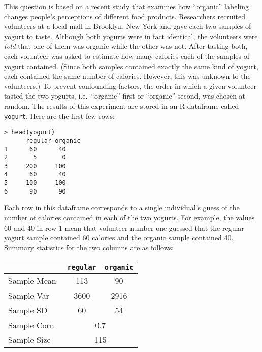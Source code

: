 \documentclass[addpoints,12pt]{exam}
\begin{document}
\begin{questions}
\question This question is based on a recent study that examines how ``organic'' labeling changes people's perceptions of different food products. Researchers recruited volunteers at a local mall in Brooklyn, New York and gave each two samples of yogurt to taste. Although both yogurts were in fact identical, the volunteers were \emph{told} that one of them was organic while the other was not. After tasting both, each volunteer was asked to estimate how many calories each of the samples of yogurt contained. (Since both samples contained exactly the same kind of yogurt, each contained the same number of calories. However, this was unknown to the volunteers.) To prevent confounding factors, the order in which a given volunteer tasted the two yogurts, i.e.\ ``organic'' first or ``organic'' second, was chosen at random. The results of this experiment are stored in an R dataframe called \texttt{yogurt}. Here are the first few rows:
	\begin{verbatim}
> head(yogurt)
	  regular organic
1      60      40
2       5       0
3     200     100
4      60      40
5     100     100
6      90      90
	\end{verbatim}
Each row in this dataframe corresponds to a single individual's guess of the number of calories contained in each of the two yogurts. For example, the values 60 and 40 in row 1 mean that volunteer number one guessed that the regular yogurt sample contained 60 calories and the organic sample contained 40. Summary statistics for the two columns are as follows:
	\begin{center}
		\begin{tabular}{|lcc|}
		\hline
			& \texttt{regular} & \texttt{organic}\\
			\hline
		Sample Mean & 113 & 90\\
		Sample Var & 3600 & 2916\\
		Sample SD & 60 & 54\\ 
		Sample Corr.\ &\multicolumn{2}{c|}{0.7} \\
		Sample Size &\multicolumn{2}{c|}{115} \\
		\hline
		\end{tabular}
	\end{center}
	\vspace{1em}
\end{questions}
\end{document}
